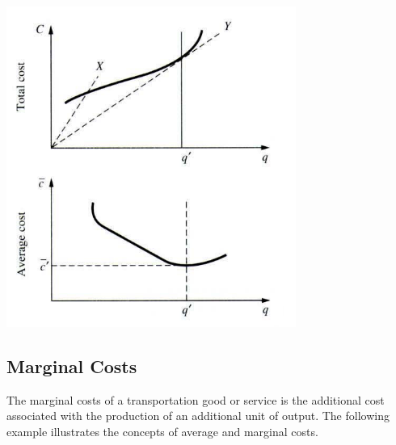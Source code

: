 \begin{center}
	\includegraphics[scale=0.8]{gfx/fig49.png}
\end{center}
\subsection{Marginal Costs}
The marginal costs of a transportation good or service is the additional cost associated with the production of an additional unit of output. The following example illustrates the concepts of average and marginal costs.
